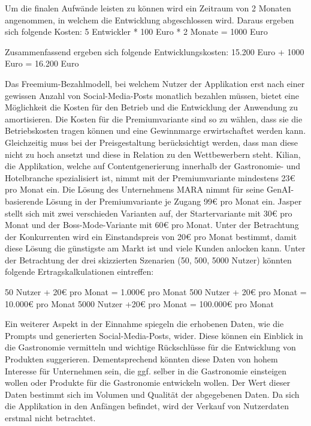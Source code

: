 Um die finalen Aufwände leisten zu können wird ein Zeitraum von 2 Monaten angenommen, in welchem die Entwicklung abgeschlossen wird.
Daraus ergeben sich folgende Kosten:
5 Entwickler * 100 Euro * 2 Monate = 1000 Euro

Zusammenfassend ergeben sich folgende Entwicklungskosten:
15.200 Euro + 1000 Euro = 16.200 Euro


Das Freemium-Bezahlmodell, bei welchem Nutzer der Applikation erst nach einer gewissen Anzahl von Social-Media-Posts monatlich bezahlen müssen, bietet eine Möglichkeit die Kosten für den Betrieb und die Entwicklung der Anwendung zu amortisieren.
Die Kosten für die Premiumvariante sind so zu wählen, dass sie die Betriebskosten tragen können und eine Gewinnmarge erwirtschaftet werden kann.
Gleichzeitig muss bei der Preisgestaltung berücksichtigt werden, dass man diese nicht zu hoch ansetzt und diese in Relation zu den Wettbewerbern steht.
Kilian, die Applikation, welche auf Contentgenerierung innerhalb der Gastronomie- und Hotelbranche spezialisiert ist, nimmt mit der Premiumvariante mindestens 23€ pro Monat ein.
Die Lösung des Unternehmens MARA nimmt für seine GenAI-basierende Lösung in der Premiumvariante je Zugang 99€ pro Monat ein.
Jasper stellt sich mit zwei verschieden Varianten auf, der Startervariante mit 30€ pro Monat und der Boss-Mode-Variante mit 60€ pro Monat.
Unter der Betrachtung der Konkurrenten wird ein Einstandspreis von 20€ pro Monat bestimmt, damit diese Lösung die günstigste am Markt ist und viele Kunden anlocken kann.
Unter der Betrachtung der drei skizzierten Szenarien (50, 500, 5000 Nutzer) könnten folgende Ertragskalkulationen eintreffen:

50 Nutzer + 20€ pro Monat = 1.000€ pro Monat
500 Nutzer + 20€ pro Monat = 10.000€ pro Monat
5000 Nutzer +20€ pro Monat = 100.000€ pro Monat


Ein weiterer Aspekt in der Einnahme spiegeln die erhobenen Daten, wie die Prompts und generierten Social-Media-Posts, wider.
Diese können ein Einblick in die Gastronomie vermitteln und wichtige Rückschlüsse für die Entwicklung von Produkten suggerieren.
Dementsprechend könnten diese Daten von hohem Interesse für Unternehmen sein, die ggf. selber in die Gastronomie einsteigen wollen oder Produkte für die Gastronomie entwickeln wollen.
Der Wert dieser Daten bestimmt sich im Volumen und Qualität der abgegebenen Daten.
Da sich die Applikation in den Anfängen befindet, wird der Verkauf von Nutzerdaten erstmal nicht betrachtet.

